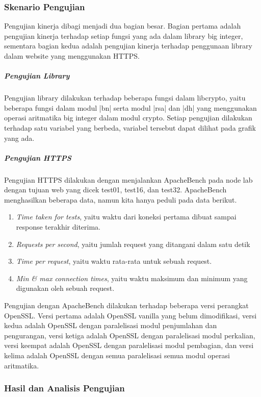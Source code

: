     \subsubsection{Skenario Pengujian}
      Pengujian kinerja dibagi menjadi dua bagian besar. Bagian pertama adalah pengujian kinerja terhadap setiap fungsi yang ada dalam library big integer, sementara bagian kedua adalah pengujian kinerja terhadap penggunaan library dalam website yang menggunakan HTTPS.

      \subparagraph{Pengujian Library}
      Pengujian library dilakukan terhadap beberapa fungsi dalam libcrypto, yaitu beberapa fungsi dalam modul |bn| serta modul |rsa| dan |dh| yang menggunakan operasi aritmatika big integer dalam modul crypto. Setiap pengujian dilakukan terhadap satu variabel yang berbeda, variabel tersebut dapat dilihat pada grafik yang ada.

      \subparagraph{Pengujian HTTPS}
      Pengujian HTTPS dilakukan dengan menjalankan ApacheBench pada node lab dengan tujuan web yang dicek test01, test16, dan test32. ApacheBench menghasilkan beberapa data, namun kita hanya peduli pada data berikut.
      \begin{enumerate}[label=\roman*.]
        \item \textit{Time taken for tests}, yaitu waktu dari koneksi pertama dibuat sampai response terakhir diterima.
        \item \textit{Requests per second}, yaitu jumlah request yang ditangani dalam satu detik
        \item \textit{Time per request}, yaitu waktu rata-rata untuk sebuah request.
        \item \textit{Min \& max connection times}, yaitu waktu maksimum dan minimum yang digunakan oleh sebuah request.
      \end{enumerate}

      Pengujian dengan ApacheBench dilakukan terhadap beberapa versi perangkat OpenSSL. Versi pertama adalah OpenSSL vanilla yang belum dimodifikasi, versi kedua adalah OpenSSL dengan paralelisasi modul penjumlahan dan pengurangan, versi ketiga adalah OpenSSL dengan paralelisasi modul perkalian, versi keempat adalah OpenSSL dengan paralelisasi modul pembagian, dan versi kelima adalah OpenSSL dengan semua paralelisasi semua modul operasi aritmatika.

    \subsubsection{Hasil dan Analisis Pengujian}


